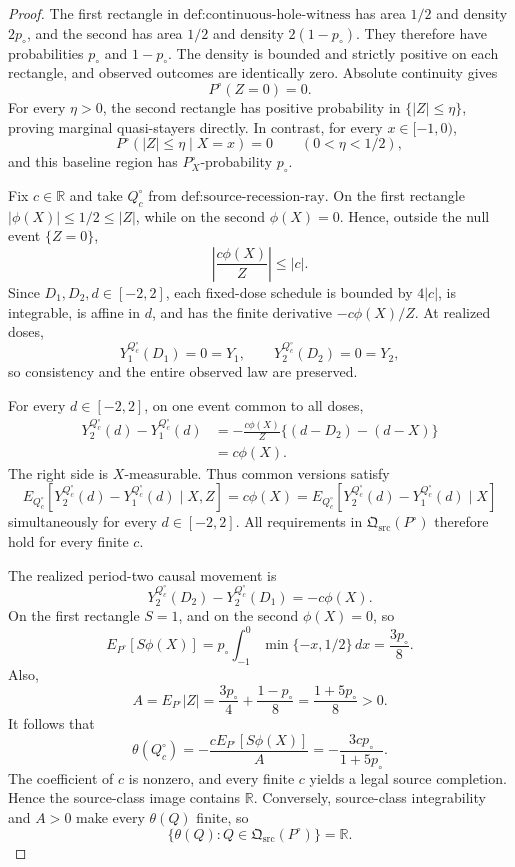 \documentclass{article}
\begin{document}
\begin{proof}
The first rectangle in \(\text{def:continuous-hole-witness}\) has area \(1/2\) and density \(2p_{\circ}\), and the second has area \(1/2\) and density \(2(1-p_{\circ})\).  They therefore have probabilities \(p_{\circ}\) and \(1-p_{\circ}\).  The density is bounded and strictly positive on each rectangle, and observed outcomes are identically zero.  Absolute continuity gives
\[
 P^{\circ}(Z=0)=0.
\]
For every \(\eta>0\), the second rectangle has positive probability in \(\{|Z|\leq\eta\}\), proving marginal quasi-stayers directly.  In contrast, for every \(x\in[-1,0)\),
\[
 P^{\circ}(|Z|\leq\eta\mid X=x)=0
 \qquad(0<\eta<1/2),
\]
and this baseline region has \(P_X^{\circ}\)-probability \(p_{\circ}\).

Fix \(c\in\mathbb R\) and take \(Q_c^{\circ}\) from \(\text{def:source-recession-ray}\).  On the first rectangle \(|\phi(X)|\leq1/2\leq|Z|\), while on the second \(\phi(X)=0\).  Hence, outside the null event \(\{Z=0\}\),
\[
 \left|\frac{c\phi(X)}Z\right|\leq|c|.
\]
Since \(D_1,D_2,d\in[-2,2]\), each fixed-dose schedule is bounded by \(4|c|\), is integrable, is affine in \(d\), and has the finite derivative \(-c\phi(X)/Z\).  At realized doses,
\[
 Y_1^{Q_c^{\circ}}(D_1)=0=Y_1,
 \qquad
 Y_2^{Q_c^{\circ}}(D_2)=0=Y_2,
\]
so consistency and the entire observed law are preserved.

For every \(d\in[-2,2]\), on one event common to all doses,
\[
 \begin{aligned}
 Y_2^{Q_c^{\circ}}(d)-Y_1^{Q_c^{\circ}}(d)
 &=-\frac{c\phi(X)}Z\{(d-D_2)-(d-X)\}\\
 &=c\phi(X).
 \end{aligned}
\]
The right side is \(X\)-measurable.  Thus common versions satisfy
\[
 E_{Q_c^{\circ}}[Y_2^{Q_c^{\circ}}(d)-Y_1^{Q_c^{\circ}}(d)\mid X,Z]
 =c\phi(X)
 =E_{Q_c^{\circ}}[Y_2^{Q_c^{\circ}}(d)-Y_1^{Q_c^{\circ}}(d)\mid X]
\]
simultaneously for every \(d\in[-2,2]\).  All requirements in \(\mathfrak Q_{\mathrm{src}}(P^{\circ})\) therefore hold for every finite \(c\).

The realized period-two causal movement is
\[
 Y_2^{Q_c^{\circ}}(D_2)-Y_2^{Q_c^{\circ}}(D_1)=-c\phi(X).
\]
On the first rectangle \(S=1\), and on the second \(\phi(X)=0\), so
\[
 E_{P^{\circ}}[S\phi(X)]
 =p_{\circ}\int_{-1}^{0}\min\{-x,1/2\}\,dx
 =\frac{3p_{\circ}}8.
\]
Also,
\[
 A=E_{P^{\circ}}|Z|
 =\frac{3p_{\circ}}4+\frac{1-p_{\circ}}8
 =\frac{1+5p_{\circ}}8>0.
\]
It follows that
\[
 \theta(Q_c^{\circ})
 =-\frac{cE_{P^{\circ}}[S\phi(X)]}{A}
 =-\frac{3cp_{\circ}}{1+5p_{\circ}}.
\]
The coefficient of \(c\) is nonzero, and every finite \(c\) yields a legal source completion.  Hence the source-class image contains \(\mathbb R\).  Conversely, source-class integrability and \(A>0\) make every \(\theta(Q)\) finite, so
\[
 \{\theta(Q):Q\in\mathfrak Q_{\mathrm{src}}(P^{\circ})\}=\mathbb R.
\]


\end{proof}
\end{document}
